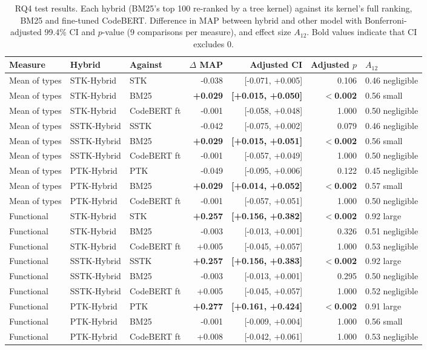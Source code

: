 \begin{table}[!htbp]
\centering
\caption{RQ4 test results. Each hybrid (BM25's top 100 re-ranked by a tree kernel) against its kernel's full ranking, BM25 and fine-tuned CodeBERT. Difference in MAP between hybrid and other model with Bonferroni-adjusted 99.4\% CI and $p$-value (9 comparisons per measure), and effect size $A_{12}$. Bold values indicate that CI excludes 0.}
\label{tab:rq4_tests}
\footnotesize
\setlength{\tabcolsep}{3pt}
\begin{tabular}{lllrrrl}
\toprule
Measure & Hybrid & Against & $\Delta$ MAP & Adjusted CI & Adjusted $p$ & $A_{12}$ \\
\midrule
Mean of types & STK-Hybrid & STK & -0.038 & [-0.071, +0.005] & 0.106 & 0.46 negligible \\
Mean of types & STK-Hybrid & BM25 & \textbf{+0.029} & \textbf{[+0.015, +0.050]} & \textbf{$<$0.002} & 0.56 small \\
Mean of types & STK-Hybrid & CodeBERT ft & -0.001 & [-0.058, +0.048] & 1.000 & 0.50 negligible \\
Mean of types & SSTK-Hybrid & SSTK & -0.042 & [-0.075, +0.002] & 0.079 & 0.46 negligible \\
Mean of types & SSTK-Hybrid & BM25 & \textbf{+0.029} & \textbf{[+0.015, +0.051]} & \textbf{$<$0.002} & 0.56 small \\
Mean of types & SSTK-Hybrid & CodeBERT ft & -0.001 & [-0.057, +0.049] & 1.000 & 0.50 negligible \\
Mean of types & PTK-Hybrid & PTK & -0.049 & [-0.095, +0.006] & 0.122 & 0.45 negligible \\
Mean of types & PTK-Hybrid & BM25 & \textbf{+0.029} & \textbf{[+0.014, +0.052]} & \textbf{$<$0.002} & 0.57 small \\
Mean of types & PTK-Hybrid & CodeBERT ft & -0.001 & [-0.057, +0.051] & 1.000 & 0.50 negligible \\
\midrule
Functional & STK-Hybrid & STK & \textbf{+0.257} & \textbf{[+0.156, +0.382]} & \textbf{$<$0.002} & 0.92 large \\
Functional & STK-Hybrid & BM25 & -0.003 & [-0.013, +0.001] & 0.326 & 0.51 negligible \\
Functional & STK-Hybrid & CodeBERT ft & +0.005 & [-0.045, +0.057] & 1.000 & 0.53 negligible \\
Functional & SSTK-Hybrid & SSTK & \textbf{+0.257} & \textbf{[+0.156, +0.383]} & \textbf{$<$0.002} & 0.92 large \\
Functional & SSTK-Hybrid & BM25 & -0.003 & [-0.013, +0.001] & 0.295 & 0.50 negligible \\
Functional & SSTK-Hybrid & CodeBERT ft & +0.005 & [-0.045, +0.057] & 1.000 & 0.52 negligible \\
Functional & PTK-Hybrid & PTK & \textbf{+0.277} & \textbf{[+0.161, +0.424]} & \textbf{$<$0.002} & 0.91 large \\
Functional & PTK-Hybrid & BM25 & -0.001 & [-0.009, +0.004] & 1.000 & 0.56 small \\
Functional & PTK-Hybrid & CodeBERT ft & +0.008 & [-0.042, +0.061] & 1.000 & 0.53 negligible \\
\bottomrule
\end{tabular}
\end{table}
